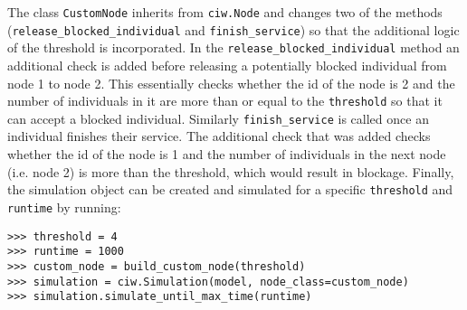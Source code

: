 The class \lstinline[style=pystyle]{CustomNode} inherits from
\lstinline[style=pystyle]{ciw.Node} and changes two of the methods
(\lstinline[style=pystyle]{release_blocked_individual} and
\lstinline[style=pystyle]{finish_service}) so that the additional logic of the
threshold is incorporated.
In the \lstinline[style=pystyle]{release_blocked_individual} method an
additional check is added before releasing a potentially blocked individual from
node 1 to node 2.
This essentially checks whether the id of the node is 2 and
the number of individuals in it are more than or equal to the
\lstinline[style=pystyle]{threshold} so that it can accept a blocked individual.
Similarly \lstinline[style=pystyle]{finish_service} is called once an individual
finishes their service.
The additional check that was added checks whether the id of the node is 1 and
the number of individuals in the next node (i.e. node 2) is more than the
threshold, which would result in blockage.
Finally, the simulation object can be created and simulated for a specific
\lstinline[style=pystyle]{threshold} and \lstinline[style=pystyle]{runtime} by
running:

\begin{lstlisting}[style=pystyle]
>>> threshold = 4
>>> runtime = 1000
>>> custom_node = build_custom_node(threshold)
>>> simulation = ciw.Simulation(model, node_class=custom_node)
>>> simulation.simulate_until_max_time(runtime)

\end{lstlisting}


